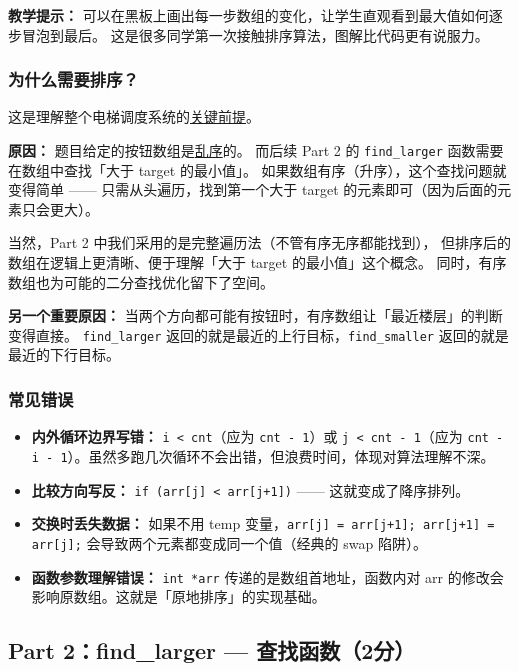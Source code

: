 \textbf{教学提示：} 可以在黑板上画出每一步数组的变化，让学生直观看到最大值如何逐步冒泡到最后。
这是很多同学第一次接触排序算法，图解比代码更有说服力。

\subsubsection{为什么需要排序？}

这是理解整个电梯调度系统的\underline{关键前提}。

\textbf{原因：} 题目给定的按钮数组是\underline{乱序}的。
而后续 Part 2 的 \texttt{find\_larger} 函数需要在数组中查找「大于 target 的最小值」。
如果数组有序（升序），这个查找问题就变得简单 —— 只需从头遍历，找到第一个大于 target 的元素即可（因为后面的元素只会更大）。

当然，Part 2 中我们采用的是完整遍历法（不管有序无序都能找到），
但排序后的数组在逻辑上更清晰、便于理解「大于 target 的最小值」这个概念。
同时，有序数组也为可能的二分查找优化留下了空间。

\textbf{另一个重要原因：}
当两个方向都可能有按钮时，有序数组让「最近楼层」的判断变得直接。
\texttt{find\_larger} 返回的就是最近的上行目标，\texttt{find\_smaller} 返回的就是最近的下行目标。

\subsubsection{常见错误}

\begin{itemize}
    \item \textbf{内外循环边界写错：} \texttt{i < cnt}（应为 \texttt{cnt - 1}）或 \texttt{j < cnt - 1}（应为 \texttt{cnt - i - 1}）。虽然多跑几次循环不会出错，但浪费时间，体现对算法理解不深。
    \item \textbf{比较方向写反：} \texttt{if (arr[j] < arr[j+1])} —— 这就变成了降序排列。
    \item \textbf{交换时丢失数据：} 如果不用 temp 变量，\texttt{arr[j] = arr[j+1]; arr[j+1] = arr[j];} 会导致两个元素都变成同一个值（经典的 swap 陷阱）。
    \item \textbf{函数参数理解错误：} \texttt{int *arr} 传递的是数组首地址，函数内对 arr 的修改会影响原数组。这就是「原地排序」的实现基础。
\end{itemize}

\bigskip
\bigskip

\subsection{Part 2：find\_larger — 查找函数（2分）}

